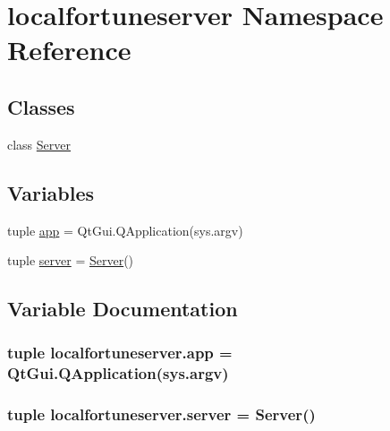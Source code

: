 \hypertarget{namespacelocalfortuneserver}{}\section{localfortuneserver Namespace Reference}
\label{namespacelocalfortuneserver}
\subsection*{Classes}
\begin{DoxyCompactItemize}
\item 
class \hyperlink{classlocalfortuneserver_1_1Server}{Server}
\end{DoxyCompactItemize}
\subsection*{Variables}
\begin{DoxyCompactItemize}
\item 
tuple \hyperlink{namespacelocalfortuneserver_ad2a256bec927ff912de138bdb7715133}{app} = Qt\+Gui.\+Q\+Application(sys.\+argv)
\item 
tuple \hyperlink{namespacelocalfortuneserver_a5927a3f30bec7b0151aef65552e4e26f}{server} = \hyperlink{classlocalfortuneserver_1_1Server}{Server}()
\end{DoxyCompactItemize}


\subsection{Variable Documentation}
\hypertarget{namespacelocalfortuneserver_ad2a256bec927ff912de138bdb7715133}{}
\subsubsection[{app}]{\setlength{\rightskip}{0pt plus 5cm}tuple localfortuneserver.\+app = Qt\+Gui.\+Q\+Application(sys.\+argv)}\label{namespacelocalfortuneserver_ad2a256bec927ff912de138bdb7715133}
\hypertarget{namespacelocalfortuneserver_a5927a3f30bec7b0151aef65552e4e26f}{}
\subsubsection[{server}]{\setlength{\rightskip}{0pt plus 5cm}tuple localfortuneserver.\+server = {\bf Server}()}\label{namespacelocalfortuneserver_a5927a3f30bec7b0151aef65552e4e26f}
